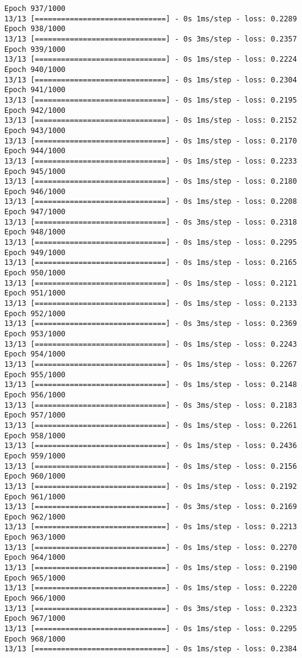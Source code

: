 \documentclass[11pt]{article}
\begin{document}
\begin{Verbatim}[commandchars=\\\{\}]
Epoch 937/1000
13/13 [==============================] - 0s 1ms/step - loss: 0.2289
Epoch 938/1000
13/13 [==============================] - 0s 3ms/step - loss: 0.2357
Epoch 939/1000
13/13 [==============================] - 0s 1ms/step - loss: 0.2224
Epoch 940/1000
13/13 [==============================] - 0s 1ms/step - loss: 0.2304
Epoch 941/1000
13/13 [==============================] - 0s 1ms/step - loss: 0.2195
Epoch 942/1000
13/13 [==============================] - 0s 1ms/step - loss: 0.2152
Epoch 943/1000
13/13 [==============================] - 0s 1ms/step - loss: 0.2170
Epoch 944/1000
13/13 [==============================] - 0s 1ms/step - loss: 0.2233
Epoch 945/1000
13/13 [==============================] - 0s 1ms/step - loss: 0.2180
Epoch 946/1000
13/13 [==============================] - 0s 1ms/step - loss: 0.2208
Epoch 947/1000
13/13 [==============================] - 0s 3ms/step - loss: 0.2318
Epoch 948/1000
13/13 [==============================] - 0s 1ms/step - loss: 0.2295
Epoch 949/1000
13/13 [==============================] - 0s 1ms/step - loss: 0.2165
Epoch 950/1000
13/13 [==============================] - 0s 1ms/step - loss: 0.2121
Epoch 951/1000
13/13 [==============================] - 0s 1ms/step - loss: 0.2133
Epoch 952/1000
13/13 [==============================] - 0s 3ms/step - loss: 0.2369
Epoch 953/1000
13/13 [==============================] - 0s 1ms/step - loss: 0.2243
Epoch 954/1000
13/13 [==============================] - 0s 1ms/step - loss: 0.2267
Epoch 955/1000
13/13 [==============================] - 0s 1ms/step - loss: 0.2148
Epoch 956/1000
13/13 [==============================] - 0s 3ms/step - loss: 0.2183
Epoch 957/1000
13/13 [==============================] - 0s 1ms/step - loss: 0.2261
Epoch 958/1000
13/13 [==============================] - 0s 1ms/step - loss: 0.2436
Epoch 959/1000
13/13 [==============================] - 0s 1ms/step - loss: 0.2156
Epoch 960/1000
13/13 [==============================] - 0s 1ms/step - loss: 0.2192
Epoch 961/1000
13/13 [==============================] - 0s 3ms/step - loss: 0.2169
Epoch 962/1000
13/13 [==============================] - 0s 1ms/step - loss: 0.2213
Epoch 963/1000
13/13 [==============================] - 0s 1ms/step - loss: 0.2270
Epoch 964/1000
13/13 [==============================] - 0s 1ms/step - loss: 0.2190
Epoch 965/1000
13/13 [==============================] - 0s 1ms/step - loss: 0.2220
Epoch 966/1000
13/13 [==============================] - 0s 3ms/step - loss: 0.2323
Epoch 967/1000
13/13 [==============================] - 0s 1ms/step - loss: 0.2295
Epoch 968/1000
13/13 [==============================] - 0s 1ms/step - loss: 0.2384

\end{Verbatim}
\end{document}
